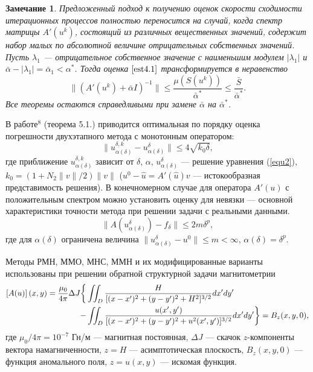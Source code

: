 \documentclass[%
autoref,     %
href,        %
facsimile,   %
colorlinks,  %
]{disser}
\newtheorem{remark}{Замечание}
\begin{document}
\begin{remark}
	Предложенный подход к получению оценок скорости сходимости итерационных процессов полностью переносится на случай, когда спектр матрицы $A'(u^k)$, состоящий из различных вещественных значений, содержит набор малых по абсолютной величине отрицательных собственных значений. Пусть $\lambda _1$ --- отрицательное собственное значение с наименьшим модулем $|\lambda_1|$ и $\bar\alpha -|\lambda _1|=\bar\alpha _1<\alpha^*$. Тогда оценка $\eqref{est4.1}$ 
	трансформируется в неравенство
	$$\|(A'(u^k)+\bar\alpha I)^{-1}\|\leqslant\frac{\mu(S(u^k))}{\bar\alpha^*}\leqslant\frac{\bar S}{\bar\alpha^*}.$$
	Все теоремы остаются справедливыми при замене $\bar\alpha$ на $\bar\alpha^*$.
\end{remark}

В работе$^8$ (теорема 5.1.) приводится оптимальная по порядку оценка погрешности двухэтапного метода с монотонным оператором:
\begin{equation*}
\|u_{\alpha(\delta)}^{\delta, k}-u_{\alpha(\delta)}^{\delta}\|\leqslant 4\sqrt{k_0 \delta},
\end{equation*}
где приближение $u_{\alpha(\delta)}^{\delta, k}$ зависит от $\delta$, $\alpha$, $u_{\alpha(\delta)}^{\delta}$ --- решение уравнения (\ref{equ2}), $k_0=(1+N_2\|v\|/2)\|v\|$ ($u^0-\hat{u}=A'(\hat{u})v$ --- истокообразная представимость решения). 
В конечномерном случае для оператора $A'(u)$ с положительным спектром можно установить оценку для невязки --- основной характеристики точности метода при решении задачи с реальными данными.
$$\|A(u_{\alpha(\delta)}^{\delta})-f_\delta\|\leqslant 2m\delta^p,$$
где для $\alpha(\delta)$ ограничена величина $\|u_{\alpha(\delta)}^{\delta}-u^0\|\leqslant m <\infty$, $\alpha(\delta)=\delta^p$. 
{\scriptsize
\let\thefootnote\relax\let\thefootnote\relax{}}

 Методы РМН, ММО, МНС, ММН и их модифицированные варианты использованы при решении обратной структурной задачи магнитометрии
\begin{equation*}\begin{aligned}
\left[A(u)\right](x,y)=\frac{\mu_0}{4\pi}\Delta J  \bigg\{&\iint_{D} \frac{H}{[(x-x')^2+(y-y')^2+H^2]^{3/2}}dx'dy' \notag\\
- &\iint_{D} \frac{u(x',y')}{[(x-x')^2+(y-y')^2+u^2(x',y')]^{3/2}}dx'dy' \bigg\}= B_z(x,y,0),
\end{aligned} \end{equation*}
где $\mu_0/{4\pi}=10^{-7}$ Гн/м --- магнитная постоянная, $\Delta J$ --- скачок $z$-компоненты вектора намагниченности, $z=H$ --- асимптотическая плоскость, $ B_z(x,y,0)$ --- функция аномального поля, $z=u(x,y)$ --- искомая функция.
\end{document}
